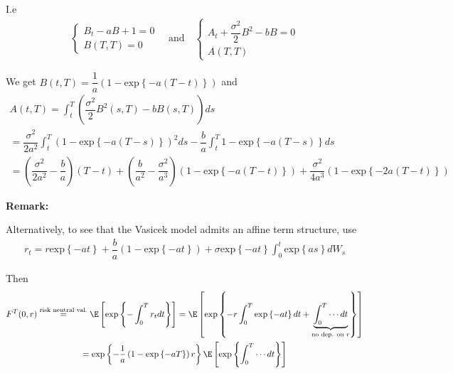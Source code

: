 \noindent I.e
\begin{equation*}
  \begin{gathered}
    \begin{cases}
      B_t-aB+1=0\\
      B(T,T) = 0
      \end{cases}\quad\text{and}\quad\begin{cases}
      A_t+\dfrac{\sigma^2}{2}B^2-bB=0\\
      A(T,T)
    \end{cases}
  \end{gathered}
\end{equation*}\par
\noindent We get $B(t,T) = \dfrac{1}{a}\left(1-\text{exp}\left\{-a(T-t)\right\}\right)$ and
\begin{equation*}
  \begin{gathered}
    A(t,T) = \int_{t}^{T}\left(\dfrac{\sigma^2}{2}B^2(s,T)-bB(s,T)\right)ds\\
    = \dfrac{\sigma^2}{2a^2}\int_{t}^{T}\left(1-\text{exp}\left\{-a(T-s)\right\}\right)^2ds-\dfrac{b}{a}\int_{t}^{T}1-\text{exp}\left\{-a(T-s)\right\}ds\\
    =\left(\dfrac{\sigma^2}{2a^2}-\dfrac{b}{a}\right)(T-t)+\left(\dfrac{b}{a^2}-\dfrac{\sigma^2}{a^3}\right)\left(1-\text{exp}\left\{-a(T-t)\right\}\right)+\dfrac{\sigma^2}{4a^3}\left(1-\text{exp}\left\{-2a(T-t)\right\}\right)
  \end{gathered}
\end{equation*}
\par\bigskip
\noindent\textbf{Remark:}\par
\noindent Alternatively, to see that the Vasicek model admits an affine term structure, use
\begin{equation*}
  \begin{gathered}
    r_t = r\text{exp}\left\{-at\right\}+\dfrac{b}{a}\left(1-\text{exp}\left\{-at\right\}\right)+\sigma\text{exp}\left\{-at\right\}\int_{0}^{t}\text{exp}\left\{as\right\}dW_s
  \end{gathered}
\end{equation*}\par
\noindent Then
\begin{equation*}
  \begin{gathered}
    F^T(0,r) \stackrel{\text{risk neutral val.}}{=} \E\left[\text{exp}\left\{-\int_{0}^{T}r_tdt\right\}\right]=\E\left[\text{exp}\left\{-r\int_{0}^{T}\text{exp}\left\{-at\right\}dt+\underbrace{\int_{0}^{T}\cdots dt}_{\substack{\text{no dep. on $r$}}}\right\}\right]\\
    =\text{exp}\left\{-\dfrac{1}{a}\left(1-\text{exp}\left\{-aT\right\}\right)r\right\}\E\left[\text{exp}\left\{\int_{0}^{T}\cdots dt\right\}\right]
  \end{gathered}
\end{equation*}\par
